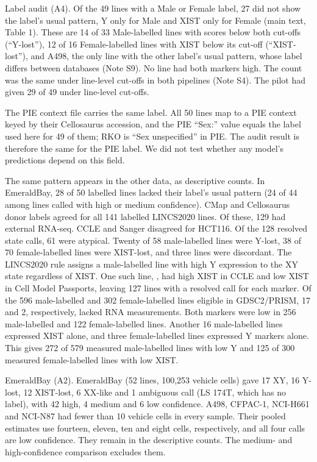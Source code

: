 \documentclass[
  11pt,
  letterpaper,
]{article}
\begin{document}
Label audit (A4). Of the 49 lines with a Male or Female label, 27 did
not show the label's usual pattern, Y only for Male and XIST only for
Female (main text, Table 1). These are 14 of 33 Male-labelled lines with
scores below both cut-offs (``Y-lost''), 12 of 16 Female-labelled lines
with XIST below its cut-off (``XIST-lost''), and A498, the only line
with the other label's usual pattern, whose label differs between
databases (Note S9). No line had both markers high. The count was the
same under line-level cut-offs in both pipelines (Note S4). The pilot
had given 29 of 49 under line-level cut-offs.

The PIE context file carries the same label. All 50 lines map to a PIE
context keyed by their Cellosaurus accession, and the PIE ``Sex:'' value
equals the label used here for 49 of them; RKO is ``Sex unspecified'' in
PIE. The audit result is therefore the same for the PIE label. We did
not test whether any model's predictions depend on this field.

The same pattern appears in the other data, as descriptive counts. In
EmeraldBay, 28 of 50 labelled lines lacked their label's usual pattern
(24 of 44 among lines called with high or medium confidence). CMap and
Cellosaurus donor labels agreed for all 141 labelled LINCS2020 lines.
Of these, 129 had external RNA-seq. CCLE and Sanger disagreed for
HCT116. Of the 128 resolved state calls, 61 were atypical. Twenty of 58
male-labelled lines were Y-lost, 38 of 70 female-labelled lines were
XIST-lost, and three lines were discordant. The LINCS2020 rule assigns
a male-labelled line with high Y expression to the XY state regardless of
XIST. One such line, , had high XIST in CCLE and low XIST in
Cell Model Passports, leaving 127 lines with a resolved call for each marker.
Of the 596 male-labelled and 302 female-labelled lines eligible in
GDSC2/PRISM, 17 and 2, respectively, lacked RNA measurements.
Both markers were low in 256 male-labelled and 122 female-labelled
lines. Another 16 male-labelled lines expressed XIST alone, and three
female-labelled lines expressed Y markers alone. This gives 272 of 579
measured male-labelled lines with low Y and 125 of 300 measured
female-labelled lines with low XIST.

EmeraldBay (A2). EmeraldBay (52 lines, 100,253 vehicle cells) gave 17
XY, 16 Y-lost, 12 XIST-lost, 6 XX-like and 1 ambiguous call (LS 174T,
which has no label), with 42 high, 4 medium and 6 low confidence. A498,
CFPAC-1, NCI-H661 and NCI-N87 had fewer than 10 vehicle cells in every
sample. Their pooled estimates use fourteen, eleven, ten and eight
cells, respectively, and all four calls are low confidence. They remain
in the descriptive counts. The medium- and high-confidence comparison
excludes them.
\end{document}
